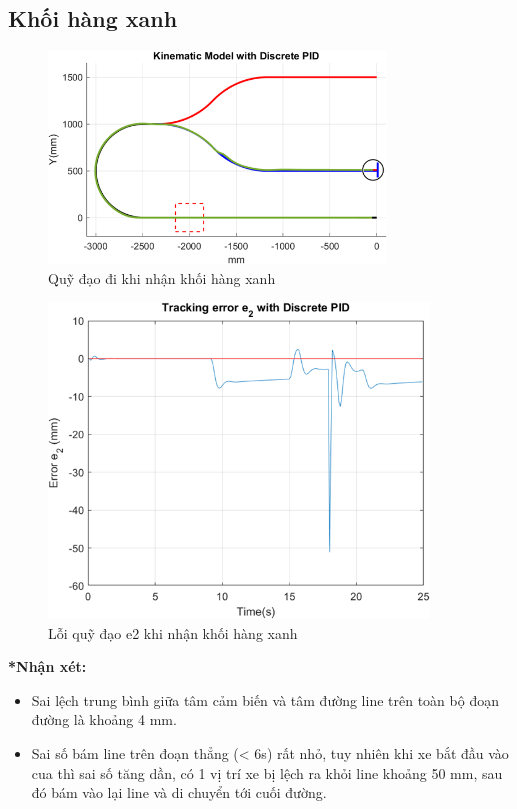           \subsection{Khối hàng xanh}
               \begin{figure}[H]
                    \centering
                    \includegraphics[width=0.8\textwidth]{pictures/chapter8/trajec_blue.png}
                    \caption{Quỹ đạo đi khi nhận khối hàng xanh}
                    \label{tra_blue}
               \end{figure}
               \begin{figure}[H]
                    \centering
                    \includegraphics[width=0.9\textwidth]{pictures/chapter8/err_blue.png}
                    \caption{Lỗi quỹ đạo e2 khi nhận khối hàng xanh}
                    \label{err_blue}
               \end{figure}
               \textbf{*Nhận xét:}
               \begin{itemize}
                    \item Sai lệch trung bình giữa tâm cảm biến và tâm đường line trên toàn bộ đoạn đường là khoảng 4 mm.
                    \item Sai số bám line trên đoạn thẳng (< 6s) rất nhỏ, tuy nhiên khi xe bắt đầu vào cua thì sai số tăng dần, có 1 vị trí xe bị lệch ra khỏi line khoảng 50 mm, sau đó bám vào lại line và di chuyển tới cuối đường. 
               \end{itemize}

